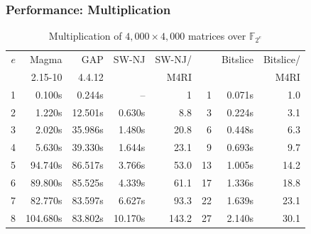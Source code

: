 \documentclass[11pt]{beamer}
\newcommand{\field}[1]{\mathbb{#1}}
\newcommand{\F}{\ensuremath{\field{F}}\xspace}
\begin{document}
\begin{frame}
\frametitle{Performance: Multiplication}

\begin{table}[ht]
\begin{scriptsize}
\begin{center}
\begin{tabular}{|r||r|r||r|r|r||r|r|}
\hline
 $e$ & Magma & GAP & SW-NJ & SW-NJ/ & \cite{M05} & Bitslice & Bitslice/\\
     & {\footnotesize 2.15-10} & {\footnotesize 4.4.12} & & M4RI & &  & M4RI\\
\hline
 1 &   0.100s &  0.244s &      -- &     1 &  1 & 0.071s &  1.0\\
 2 &   1.220s & 12.501s &  0.630s &   8.8 &  3 & 0.224s &  3.1\\
 3 &   2.020s & 35.986s &  1.480s &  20.8 &  6 & 0.448s &  6.3\\
 4 &   5.630s & 39.330s &  1.644s &  23.1 &  9 & 0.693s &  9.7\\
 5 &  94.740s & 86.517s &  3.766s &  53.0 & 13 & 1.005s & 14.2\\
 6 &  89.800s & 85.525s &  4.339s &  61.1 & 17 & 1.336s & 18.8\\
 7 &  82.770s & 83.597s &  6.627s &  93.3 & 22 & 1.639s & 23.1\\
 8 & 104.680s & 83.802s & 10.170s & 143.2 & 27 & 2.140s & 30.1\\
\hline
\end{tabular}
\caption{Multiplication of $4,000 \times 4,000$ matrices over $\F_{2^e}$}
\label{tab:karatsuba_mat_mul_times}
\end{center}
\end{scriptsize}
\end{table}
\framebreak 
\end{frame}
\end{document}
